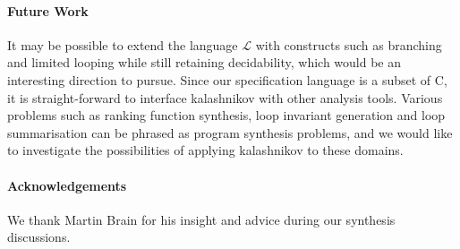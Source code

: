 \documentclass[a4paper]{llncs}
\begin{document}
\paragraph{Future Work}

It may be possible to extend the language $\mathcal{L}$ with constructs such
as branching and limited looping while still retaining decidability, which
would be an interesting direction to pursue.  Since our specification
language is a subset of C, it is straight-forward to interface {\sc
kalashnikov} with other analysis tools.  Various problems such as ranking
function synthesis, loop invariant generation and loop summarisation can be
phrased as program synthesis problems, and we would like to investigate the
possibilities of applying {\sc kalashnikov} to these domains.

\paragraph{Acknowledgements}
We thank Martin Brain for his insight and advice during our synthesis discussions.


{}

\end{document}
